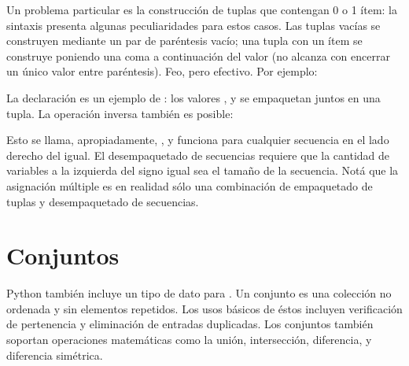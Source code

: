 \documentclass[a4,10pt,spanish]{sphinxmanual}
\begin{document}
\sphinxAtStartPar
Un problema particular es la construcción de tuplas que contengan 0 o 1 ítem: la sintaxis presenta algunas peculiaridades para estos casos.  Las tuplas vacías se construyen mediante un par de paréntesis vacío; una tupla con un ítem se construye poniendo una coma a continuación del valor (no alcanza con encerrar un único valor entre paréntesis).  Feo, pero efectivo.  Por ejemplo:

\begin{sphinxVerbatim}[commandchars=\\\{\}]
  
      
\end{sphinxVerbatim}

\sphinxAtStartPar
La declaración  es un ejemplo de : los valores ,  y  se empaquetan juntos en una tupla. La operación inversa también es posible:

\begin{sphinxVerbatim}[commandchars=\\\{\}]
    
\end{sphinxVerbatim}

\sphinxAtStartPar
Esto se llama, apropiadamente, , y funciona para cualquier secuencia en el lado derecho del igual.  El desempaquetado de secuencias requiere que la cantidad de variables a la izquierda del signo igual sea el tamaño de la secuencia.  Notá que la asignación múltiple es en realidad sólo una combinación de empaquetado de tuplas y desempaquetado de secuencias.


\section{Conjuntos}
\label{\detokenize{tutorial/datastructures:sets}}\label{\detokenize{tutorial/datastructures:tut-sets}}
\sphinxAtStartPar
Python también incluye un tipo de dato para .  Un conjunto es una colección no ordenada y sin elementos repetidos.  Los usos básicos de éstos incluyen verificación de pertenencia y eliminación de entradas duplicadas. Los conjuntos también soportan operaciones matemáticas como la unión, intersección, diferencia, y diferencia simétrica.
\end{document}
